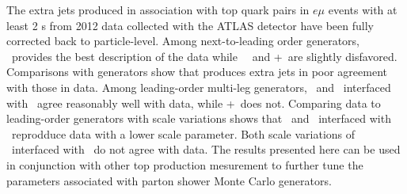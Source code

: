 The extra jets produced in association with top quark pairs in $e\mu$ events with at least 2 \bjet s from 2012 data collected with the ATLAS detector have been fully corrected back to particle-level. Among next-to-leading order generators, 
\hdamp\ provides the best description of the data while
\powpy\, \peight\ and \pow+\hw\ are slightly disfavored. Comparisons with generators show that \mcnlohw produces extra jets in poor agreement with those in data. Among leading-order multi-leg generators,  \madgraph\ and \alpg\ interfaced with \py\ agree reasonably well with data,  while \alpg+\hw\ does not. Comparing data to leading-order generators with scale variations shows  that \madgraph\ and \alpg\ interfaced with \py\ reprodduce data with a lower scale parameter. Both scale variations of \acermc\ interfaced with \py\ do not agree with data. The results presented here can be used in conjunction with other top production mesurement to further tune the parameters associated with parton shower Monte Carlo generators.